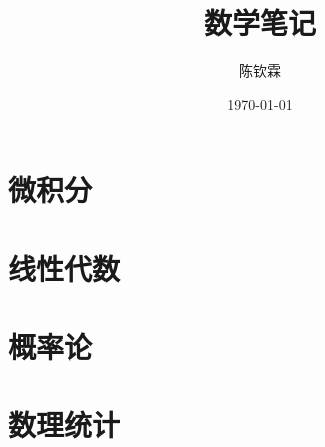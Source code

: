 \documentclass[oneside,hyperref,a4paper,UTF8]{ctexbook}
\theoremstyle{definition} \newtheorem{definition}{定义}[chapter]
\theoremstyle{definition} \newtheorem{theorem}[definition]{定理}
\theoremstyle{definition} \newtheorem{lemma}[definition]{引理}
\theoremstyle{definition} \newtheorem{corollary}[definition]{推论}
\theoremstyle{remark} \newtheorem*{remark}{Remark}
\begin{document}
\author{陈钦霖}
\title{数学笔记}
\date{\today}

\maketitle
\tableofcontents

\part{微积分}



\part{线性代数}







\part{概率论}






\part{数理统计}

\end{document}
